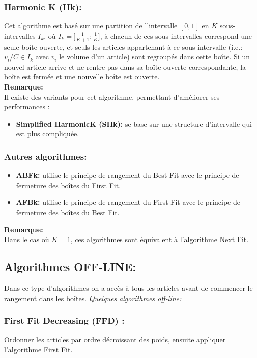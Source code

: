 \documentclass[class=report, crop=false]{standalone}
\begin{document}
        \subsubsection{Harmonic K (Hk): } Cet algorithme est basé sur une partition de l'intervalle \([0,1]\) en \(K\) sous-intervalles \(I_k\), où  \(I_k=]\frac{1}{K + 1};\frac{1}{K}]\), à chacun de ces sous-intervalles correspond une seule boîte ouverte, et seuls les articles appartenant à ce sous-intervalle (i.e.: \(v_i / C \in I_k\) avec \(v_i\) le volume d'un article) sont regroupés dans cette boîte. Si un nouvel article arrive et ne rentre pas dans sa boîte ouverte correspondante, la boîte est fermée et une nouvelle boîte est ouverte.
        \\ \textbf{Remarque:} \\
        Il existe des variants pour cet algorithme, permettant d’améliorer ses performances : 
        \renewcommand{\labelitemi}{$\circ$}  
        \begin{itemize}
            \item \textbf{Simplified HarmonicK (SHk): } se base sur une structure d’intervalle qui est plus compliquée.
        \end{itemize}
        \subsubsection{Autres algorithmes: }
        \renewcommand{\labelitemi}{$\circ$}  
        \begin{itemize}
            \item \textbf{ABFk: } utilise le principe de rangement du Best Fit avec le principe de fermeture des boîtes du First Fit.
            \item \textbf{AFBk: } utilise le principe de rangement du First Fit avec le principe de fermeture des boîtes du Best Fit.
        \end{itemize}
        \textbf{Remarque: } \\
        Dans le cas où \(K=1\), ces algorithmes sont équivalent à l’algorithme Next Fit. 
        \subsection{Algorithmes OFF-LINE: }
        Dans ce type d’algorithmes on a accès à tous les articles avant de commencer le rangement dans les boîtes. 
        \emph{Quelques algorithmes off-line:}
        \subsubsection{First Fit Decreasing (FFD) : }
        Ordonner les articles par ordre décroissant des poids, ensuite appliquer l’algorithme First Fit.
\end{document}
